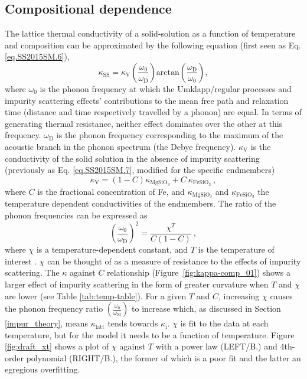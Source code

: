  
 
 
 
\subsection{Compositional dependence}

The lattice thermal conductivity of a solid-solution as a function of temperature and composition can be approximated by the following equation (first seen as Eq. \ref{eq.SS2015SM.6}),
%
\begin{equation}
\kappa_{\mathrm{SS}}=\kappa_{\mathrm{V}}\left ( \frac{\omega_{\mathrm{0}}}{\omega_{\mathrm{D}}} \right )\mathrm{arctan}\left ( \frac{\omega_{\mathrm{D}}}{\omega_{\mathrm{0}}} \right ),
\label{eq.ohta7}
\end{equation}
%
where $\omega_{\mathrm{0}}$ is the phonon frequency at which the Umklapp/regular processes and impurity scattering effects' contributions to the mean free path and relaxation time (distance and time respectively travelled by a phonon) are equal. In terms of generating thermal resistance, neither effect dominates over the other at this frequency. $\omega_{\mathrm{D}}$ is the phonon frequency corresponding to the maximum of the acoustic branch in the phonon spectrum (the Debye frequency). $\kappa_{\mathrm{V}}$ is the conductivity of the solid solution in the absence of impurity scattering (previously as Eq. \ref{eq.SS2015SM.7}, modified for the specific \mgfesios endmembers)
%
\begin{equation}
\kappa_{\mathrm{V}}=\left ( 1-C \right )\kappa_{\mathrm{MgSiO_{3}}}+C\ \kappa_{\mathrm{FeSiO_{3}}}\ ,
\label{eq.ohta9}
\end{equation}
%
where $C$ is the fractional concentration of Fe, and $\kappa_{\mathrm{MgSiO_{3}}}$ and $\kappa_{\mathrm{FeSiO_{3}}}$ the temperature dependent conductivities of the endmembers. The ratio of the phonon frequencies can be expressed as
%
\begin{equation}
\left ( \frac{\omega_{\mathrm{0}}}{\omega_{\mathrm{D}}} \right )^{2}=\frac{\chi^{T}}{C\left ( 1-C \right )}\ ,
\label{eq.ohta8}
\end{equation}
%
where $\chi$ is a temperature-dependent constant, and $T$ is the temperature of interest \citep{Padture1997}. $\chi$ can be thought of as a measure of resistance to the effects of impurity scattering. The $\kappa$ against $C$ relationship (Figure~\ref{fig:kappa-comp_01}) shows a larger effect of impurity scattering in the form of greater curvature when $T$ and $\chi$ are lower (see Table \ref{tab:temp-table}). For a given $T$ and $C$, increasing $\chi$ causes the phonon frequency ratio $\left ( \frac{\omega_{\mathrm{0}}}{\omega_{\mathrm{M}}}\right )$ to increase which, as discussed in Section \ref{impur_theory}, means $\kappa_{\mathrm{latt}}$ tends towards $\kappa_{\mathrm{i}}$. $\chi$ is fit to the data at each temperature, but for the model it needs to be a function of temperature. Figure \ref{fig:draft_xt} shows a plot of $\chi$ against $T$ with a power law (LEFT/B.) and 4th-order polynomial (RIGHT/B.), the former of which is a poor fit and the latter an egregious overfitting. 

